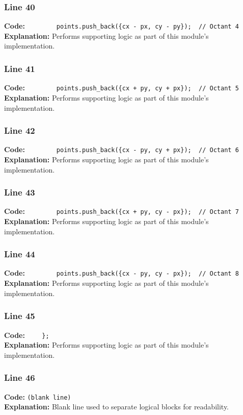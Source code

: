 \documentclass[11pt,a4paper]{article}
\begin{document}
\subsubsection*{Line 40}
\textbf{Code:} \verb|        points.push_back({cx - px, cy - py});  // Octant 4|\\
\textbf{Explanation:} Performs supporting logic as part of this module's implementation.

\subsubsection*{Line 41}
\textbf{Code:} \verb|        points.push_back({cx + py, cy + px});  // Octant 5|\\
\textbf{Explanation:} Performs supporting logic as part of this module's implementation.

\subsubsection*{Line 42}
\textbf{Code:} \verb|        points.push_back({cx - py, cy + px});  // Octant 6|\\
\textbf{Explanation:} Performs supporting logic as part of this module's implementation.

\subsubsection*{Line 43}
\textbf{Code:} \verb|        points.push_back({cx + py, cy - px});  // Octant 7|\\
\textbf{Explanation:} Performs supporting logic as part of this module's implementation.

\subsubsection*{Line 44}
\textbf{Code:} \verb|        points.push_back({cx - py, cy - px});  // Octant 8|\\
\textbf{Explanation:} Performs supporting logic as part of this module's implementation.

\subsubsection*{Line 45}
\textbf{Code:} \verb|    };|\\
\textbf{Explanation:} Performs supporting logic as part of this module's implementation.

\subsubsection*{Line 46}
\textbf{Code:} \texttt{(blank line)}\\
\textbf{Explanation:} Blank line used to separate logical blocks for readability.
\end{document}
